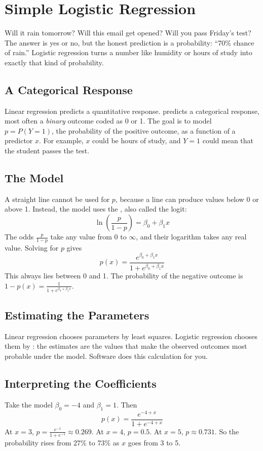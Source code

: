 \chapter{Simple Logistic Regression}

Will it rain tomorrow? Will this email get opened? Will you pass Friday's
test? The answer is yes or no, but the honest prediction is a probability:
``70\% chance of rain.'' Logistic regression turns a number like humidity or
hours of study into exactly that kind of probability.

\section{A Categorical Response}
Linear regression predicts a quantitative response. 
predicts a categorical response, most often a \emph{binary} outcome coded as 0 or 1.
The goal is to model $p = P(Y = 1)$, the probability of the positive outcome, as a function of a predictor $x$. For example, $x$ could be hours of study, and $Y = 1$ could mean that the student passes the test.

\section{The Model}
A straight line cannot be used for $p$, because a line can produce values below 0 or
above 1. Instead, the model uses the , also called the logit:
$$\ln\left(\frac{p}{1 - p}\right) = \beta_0 + \beta_1 x$$
The odds $\frac{p}{1-p}$ take any value from 0 to $\infty$, and their logarithm takes any
real value. Solving for $p$ gives
$$p(x) = \frac{e^{\beta_0 + \beta_1 x}}{1 + e^{\beta_0 + \beta_1 x}}$$
This always lies between 0 and 1. The probability of the negative outcome is
$1 - p(x) = \frac{1}{1 + e^{\beta_0 + \beta_1 x}}$.

\section{Estimating the Parameters}
Linear regression chooses parameters by least squares. Logistic regression chooses
them by : the estimates are the values that make the
observed outcomes most probable under the model. Software does this calculation for you.

\section{Interpreting the Coefficients}
Take the model $\beta_0 = -4$ and $\beta_1 = 1$. Then
$$p(x) = \frac{e^{-4 + x}}{1 + e^{-4 + x}}$$
At $x = 3$, $p = \frac{e^{-1}}{1 + e^{-1}} \approx 0.269$. At $x = 4$, $p = 0.5$. At
$x = 5$, $p \approx 0.731$. So the probability rises from 27\% to 73\% as $x$ goes from
3 to 5.

